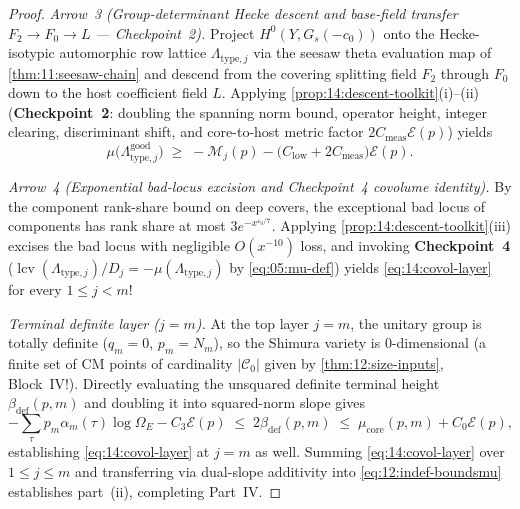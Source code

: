 \begin{proof}
\medskip\noindent
\emph{Arrow~3 (Group-determinant Hecke descent and base-field transfer $F_2 \to F_0 \to L$ — Checkpoint~2).}
Project $H^0(Y, G_s(-c_0))$ onto the Hecke-isotypic automorphic row lattice $\Lambda_{\mathrm{type}, j}$ via the seesaw theta evaluation map of \cref{thm:11:seesaw-chain} and descend from the covering splitting field $F_2$ through $F_0$ down to the host coefficient field $L$. Applying \cref{prop:14:descent-toolkit}(i)--(ii) (\textbf{Checkpoint~2}: doubling the spanning norm bound, operator height, integer clearing, discriminant shift, and core-to-host metric factor $2C_{\mathrm{meas}}\mathcal{E}(p)$) yields
\[
  \mu\bigl(\Lambda_{\mathrm{type}, j}^{\mathrm{good}}\bigr) \;\ge\; -\mathcal{M}_j(p) - \bigl(C_{\mathrm{low}} + 2 C_{\mathrm{meas}}\bigr)\mathcal{E}(p).
\]

\medskip\noindent
\emph{Arrow~4 (Exponential bad-locus excision and Checkpoint~4 covolume identity).}
By the component rank-share bound on deep covers, the exceptional bad locus of components has rank share at most $3 e^{-x^{\varepsilon_0/7}}$. Applying \cref{prop:14:descent-toolkit}(iii) excises the bad locus with negligible $O(x^{-10})$ loss, and invoking \textbf{Checkpoint~4} ($\operatorname{lcv}(\Lambda_{\mathrm{type}, j})/D_j = -\mu(\Lambda_{\mathrm{type}, j})$ by \eqref{eq:05:mu-def}) yields \eqref{eq:14:covol-layer} for every $1 \le j < m$!

\medskip\noindent
\emph{Terminal definite layer ($j = m$).}
At the top layer $j = m$, the unitary group is totally definite ($q_m = 0$, $p_m = N_m$), so the Shimura variety is $0$-dimensional (a finite set of CM points of cardinality $|\mathcal{C}_0|$ given by \cref{thm:12:size-inputs}, Block~IV!). Directly evaluating the unsquared definite terminal height $\beta_{\mathrm{def}}(p, m)$ and doubling it into squared-norm slope gives
\[
  -\sum_{\tau} p_m \alpha_m(\tau)\log\Omega_E - C_3\mathcal{E}(p)
  \;\le\; 2\beta_{\mathrm{def}}(p, m)
  \;\le\; \mu_{\mathrm{core}}(p, m) + C_0\mathcal{E}(p),
\]
establishing \eqref{eq:14:covol-layer} at $j = m$ as well. Summing \eqref{eq:14:covol-layer} over $1 \le j \le m$ and transferring via dual-slope additivity into \eqref{eq:12:indef-boundsmu} establishes part~(ii), completing Part~IV.
\end{proof}
